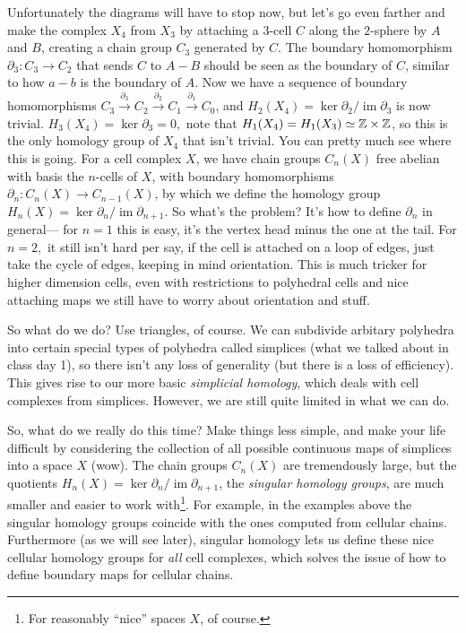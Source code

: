 Unfortunately the diagrams will have to stop now, but let's go even farther and make the complex $X_4$ from $X_3$ by attaching a $3$-cell $C$ along the $2$-sphere by $A$ and $B$, creating a chain group $C_3$ generated by $C$. The boundary homomorphism $\partial_3 \colon C_3 \to C_2 $ that sends $C$ to $A-B$ should be seen as the boundary of $C$, similar to how $a-b$ is the boundary of $A$. Now we have a sequence of boundary homomorphisms $C_3 \overset{\partial_3}{\longrightarrow}C_2\overset{\partial_2}{\longrightarrow} C_1 \overset{\partial_1}{\longrightarrow}C_0$, and $H_2(X_4)=\ker \partial_2 /\operatorname{im}\partial_3  $ is now trivial. $H_3(X_4)=\ker \partial_3=0, $ note that $H_1(X_4)=H_1(X_3)\simeq\mathbb{Z}\times \mathbb{Z}$, so this is the only homology group of $X_4$ that isn't trivial.
\orbreak
You can pretty much see where this is going. For a cell complex $X$, we have chain groups $C_n(X)$ free abelian with basis the $n$-cells of $X$, with boundary homomorphisms $\partial_n \colon C_n(X) \to C_{n-1} (X)$, by which we define the homology group $H_n(X) = \ker \partial_n / \operatorname{im}\partial _{n+1} $. So what's the problem? It's how to define $\partial_n $ in general— for $n=1$ this is easy, it's the vertex head minus the one at the tail. For $n=2,$ it still isn't hard per say, if the cell is attached on a loop of edges, just take the cycle of edges, keeping in mind orientation. This is much tricker for higher dimension cells, even with restrictions to polyhedral cells and nice attaching maps we still have to worry about orientation and stuff.

So what do we do? Use triangles, of course. We can subdivide arbitary polyhedra into certain special types of polyhedra called simplices (what we talked about in class day 1), so there isn't any loss of generality (but there is a loss of efficiency). This gives rise to our more basic \emph{simplicial homology}, which deals with cell complexes from simplices. However, we are still quite limited in what we can do.

So, what do we really do this time? Make things less simple, and make your life difficult by considering the collection of all possible continuous maps of simplices into a space $X$ (wow). The chain groups $C_n(X)$ are tremendously large, but the quotients $H_n(X)=\ker \partial_n / \operatorname{im}\partial _{n+1} $, the \emph{singular homology groups}, are much smaller and easier to work with\footnote{For reasonably ``nice'' spaces $X$, of course.}. For example, in the examples above the singular homology groups coincide with the ones computed from cellular chains. Furthermore (as we will see later), singular homology lets us define these nice cellular homology groups for \emph{all} cell complexes, which solves the issue of how to define boundary maps for cellular chains.

